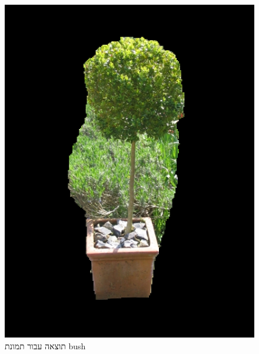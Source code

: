 \documentclass[a4paper,12pt]{article}
\begin{document}
\begin{figure}[H]
    \centering
    \begin{minipage}{0.3\textwidth}
        \centering
        \includegraphics[width=\textwidth]{my_reasults/final_img/bush_result.png}
        \caption{תוצאה עבור תמונת bush}
    \end{minipage}
    \hfill
    \begin{minipage}{0.3\textwidth}
        \centering

\end{minipage}
\end{figure}
\end{document}
